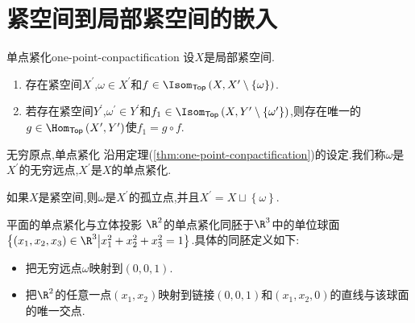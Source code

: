 \section{紧空间到局部紧空间的嵌入}

\begin{theorem}{单点紧化}{one-point-conpactification}
	设$X$是局部紧空间.
	\begin{enumerate}
		\item 存在紧空间$X^{\prime}$,$\omega\in X^{\prime}$和$f\in\Isom_{\mathsf{Top}}\left(X,X^{\prime}\setminus\left\{\omega\right\}\right)$.
		\item 若存在紧空间$Y^{\prime}$,$\omega^{\prime}\in Y^{\prime}$和$f_{1}\in\Isom_{\mathsf{Top}}\left(X,Y^{\prime}\setminus\left\{\omega^{\prime}\right\}\right)$,则存在唯一的$g\in\Hom_{\mathsf{Top}}\left(X^{\prime},Y^{\prime}\right)$使$f_{1}=g\circ f$.
	\end{enumerate}
\end{theorem}

\begin{definition}{无穷原点,单点紧化}{}
	沿用定理(\ref{thm:one-point-conpactification})的设定.我们称$\omega$是$X^{\prime}$的无穷远点,$X^{\prime}$是$X$的单点紧化.
\end{definition}

\begin{remark}{}{}
	如果$X$是紧空间,则$\omega$是$X^{\prime}$的孤立点,并且$X^{\prime}=X\sqcup\left\{\omega\right\}$.
\end{remark}

\begin{example}{平面的单点紧化与立体投影}{}
	$\R^{2}$的单点紧化同胚于$\R^{3}$中的单位球面$\left\{\left(x_{1},x_{2},x_{3}\right)\in\R^{3}\middle|x_{1}^{2}+x_{2}^{2}+x_{3}^{2}=1\right\}$.具体的同胚定义如下:
	\begin{itemize}
		\item 把无穷远点$\omega$映射到$\left(0,0,1\right)$.
		\item 把$\R^{2}$的任意一点$\left(x_{1},x_{2}\right)$映射到链接$\left(0,0,1\right)$和$\left(x_{1},x_{2},0\right)$的直线与该球面的唯一交点.
	\end{itemize}
\end{example}










